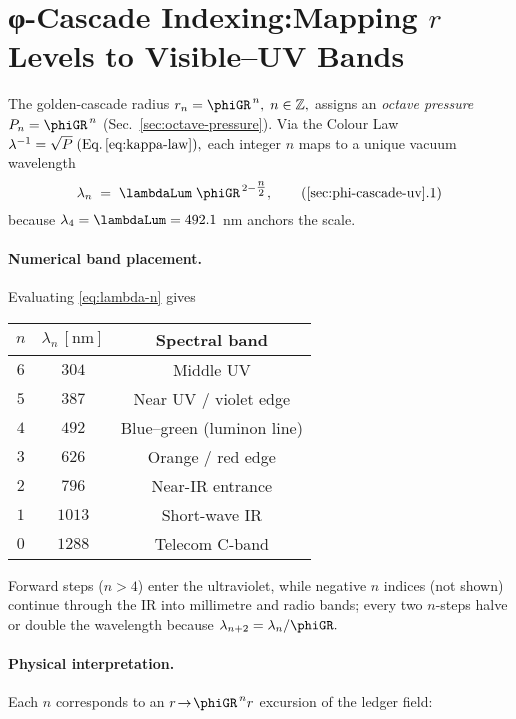 \documentclass[11pt,oneside]{book}
\begin{document}
{%
\section{φ-Cascade Indexing:\;Mapping $r$ Levels to Visible–UV Bands}
\label{sec:phi-cascade-uv}

The golden-cascade radius
\(
   r_{n}=\phiGR^{\,n},
   \;n\in\mathbb Z,
\)
assigns an \emph{octave pressure}
\(P_{n}=\phiGR^{\,n}\) (Sec.~\ref{sec:octave-pressure}).  
Via the Colour Law
\(
   \lambda^{-1}=\sqrt{P}
   \;\text{(Eq.\,\ref{eq:kappa-law})},
\)
each integer $n$ maps to a unique vacuum wavelength  
\[
   \lambda_{n}
   \;=\;
   \lambdaLum\;
   \phiGR^{\,2-\tfrac{n}{2}},
   \tag{\ref*{sec:phi-cascade-uv}.1}\label{eq:lambda-n}
\]
because $\lambda_{4}=\lambdaLum=492.1$ nm anchors the scale.

\paragraph{Numerical band placement.}
Evaluating \eqref{eq:lambda-n} gives

\vspace{0.3\baselineskip}
\centering
\begin{tabular}{c@{\quad}c@{\quad}c}
\toprule
$n$ & $\lambda_{n}\,[\mathrm{nm}]$ & Spectral band \\ \midrule
$6$ & $304$ & Middle UV \\
$5$ & $387$ & Near UV / violet edge \\
$4$ & $492$ & Blue--green (luminon line) \\
$3$ & $626$ & Orange / red edge \\
$2$ & $796$ & Near-IR entrance \\
$1$ & $1013$ & Short-wave IR \\
$0$ & $1288$ & Telecom C-band \\
\bottomrule
\end{tabular}
\vspace{0.5\baselineskip}

Forward steps ($n>4$) enter the ultraviolet, while negative $n$
indices (not shown) continue through the IR into millimetre and radio
bands; every two $n$-steps halve or double the wavelength because
\(
   \lambda_{n+2} = \lambda_{n}/\phiGR.
\)

\paragraph{Physical interpretation.}
Each $n$ corresponds to an $r\!\to\!\phiGR^{\,n}r$ excursion of the
ledger field:

}
\end{document}
